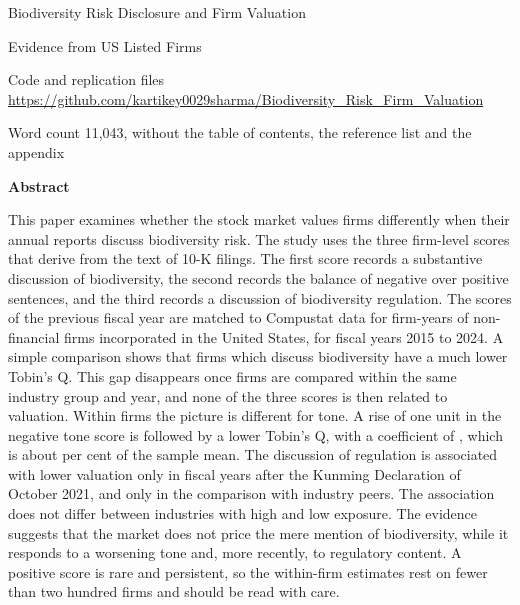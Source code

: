 \documentclass[12pt,a4paper]{article}
\newcommand{\wordcount}{11,043}
\begin{document}
\begin{center}
{\LARGE Biodiversity Risk Disclosure and Firm Valuation\par}
\vspace{6pt}
{\large Evidence from US Listed Firms\par}
\vspace{16pt}
{\small Code and replication files\\
\url{https://github.com/kartikey0029sharma/Biodiversity_Risk_Firm_Valuation}\par}
\vspace{8pt}
{\small Word count \wordcount{}, without the table of contents, the reference list and the appendix\par}
\vspace{22pt}
{\large\bfseries Abstract\par}
\end{center}

\begingroup{}
\noindent This paper examines whether the stock market values firms differently when their annual reports discuss biodiversity risk. The study uses the three firm-level scores that \citet{giglio2026} derive from the text of 10-K filings. The first score records a substantive discussion of biodiversity, the second records the balance of negative over positive sentences, and the third records a discussion of biodiversity regulation. The scores of the previous fiscal year are matched to Compustat data for \nFinal{} firm-years of \nFirmsFinal{} non-financial firms incorporated in the United States, for fiscal years 2015 to 2024. A simple comparison shows that firms which discuss biodiversity have a much lower Tobin's Q. This gap disappears once firms are compared within the same industry group and year, and none of the three scores is then related to valuation. Within firms the picture is different for tone. A rise of one unit in the negative tone score is followed by a lower Tobin's Q, with a coefficient of \coefFAllNeg{}, which is about \effNegMean{} per cent of the sample mean. The discussion of regulation is associated with lower valuation only in fiscal years after the Kunming Declaration of October 2021, and only in the comparison with industry peers. The association does not differ between industries with high and low exposure. The evidence suggests that the market does not price the mere mention of biodiversity, while it responds to a worsening tone and, more recently, to regulatory content. A positive score is rare and persistent, so the within-firm estimates rest on fewer than two hundred firms and should be read with care.
\end{document}
